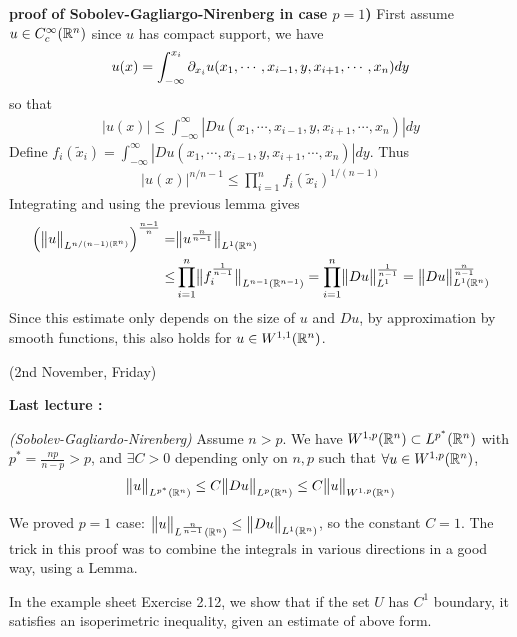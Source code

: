 \documentclass[10pt,a4paper]{report}
\newenvironment{proof}
{\begin{changemargin}{1cm}{0.5cm} 
	}%
	{\end{changemargin}
}
\begin{document}
\begin{proof}
\textbf{proof of Sobolev-Gagliargo-Nirenberg in case $p=1$)} First assume $u\in C_c^{\infty}(\mathbb{R}^n)$ since $u$ has compact support, we have
\begin{align*}
u(x) = \int_{-\infty}^{x_i} \partial_{x_i} u(x_1, \cdots, x_{i-1}, y, x_{i+1}, \cdots, x_n) dy
\end{align*}
so that
\begin{align*}
|u(x)| \leq \int_{-\infty}^{\infty} |Du(x_1, \cdots, x_{i-1},y,x_{i+1},\cdots, x_n)| dy
\end{align*}
Define $f_i(\tilde{x}_i)  = \int_{-\infty}^{\infty} |Du(x_1, \cdots, x_{i-1},y,x_{i+1},\cdots, x_n)| dy$. Thus
\begin{align*}
|u(x)|^{n/n-1} \leq \prod_{i=1}^n f_i(\tilde{x}_i)^{1/(n-1)}
\end{align*}
Integrating and using the previous lemma gives
\begin{align*}
\Big( \bigl\lVert u\bigr\rVert_{L^{n/(n-1)(\mathbb{R}^n)}}  \Big)^{\frac{n-1}{n}} =& \bigl\lVert u^{\frac{n}{n-1}}\bigr\rVert_{L^1(\mathbb{R}^n)}  \\
\leq& \prod_{i=1}^n \bigl\lVert f_i^{\frac{1}{n-1}}\bigr\rVert_{L^{n-1}(\mathbb{R}^{n-1})} = \prod_{i=1}^n \bigl\lVert Du\bigr\rVert_{L^1}^{\frac{1}{n-1}} = \bigl\lVert Du\bigr\rVert_{L^1(\mathbb{R}^n)}^{\frac{n}{n-1}}
\end{align*}
Since this estimate only depends on the size of $u$ and $Du$, by approximation by smooth functions, this also holds for $u\in W^{1,1}(\mathbb{R}^n)$.

\eop
\end{proof}
\s

\newday

(2nd November, Friday)
\s

\textbf{Last lecture :}

\thm \emph{(Sobolev-Gagliardo-Nirenberg)} Assume $n>p$. We have $W^{1,p}(\mathbb{R}^n) \subset L^{p^*} (\mathbb{R}^n)$ with $p^* = \frac{np}{n-p}>p$, and $\exists C >0$ depending only on $n,p$ such that $\forall u \in W^{1,p}(\mathbb{R}^n)$,
\begin{align*}
\bigl\lVert u\bigr\rVert_{L^{p^*}(\mathbb{R}^n)} \leq C \bigl\lVert Du\bigr\rVert_{L^p(\mathbb{R}^n)} \leq C\bigl\lVert u\bigr\rVert_{W^{1,p}(\mathbb{R}^n)}
\end{align*}
\s

We proved $p=1$ case: $\bigl\lVert u\bigr\rVert_{L^{\frac{n}{n-1}}(\mathbb{R}^n)} \leq \bigl\lVert Du\bigr\rVert_{L^1(\mathbb{R}^n)}$, so the constant $C =1$. The trick in this proof was to combine the integrals in various directions in a good way, using a Lemma.

In the example sheet Exercise 2.12, we show that if the set $U$ has $C^1$ boundary, it satisfies an isoperimetric inequality, given an estimate of above form.
\s
\end{document}
